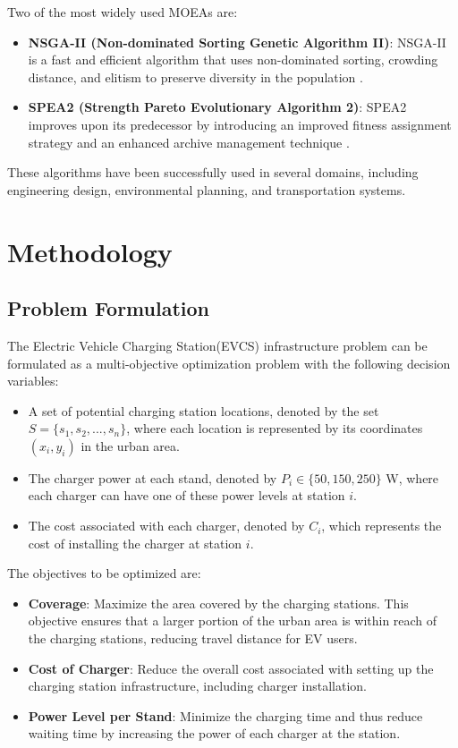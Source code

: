 \documentclass[12pt]{report}
\begin{document}
Two of the most widely used MOEAs are:
\begin{itemize}
    \item \textbf{NSGA-II (Non-dominated Sorting Genetic Algorithm II)}: NSGA-II is a fast and efficient algorithm that uses non-dominated sorting, crowding distance, and elitism to preserve diversity in the population \cite{ref6}.
    \item \textbf{SPEA2 (Strength Pareto Evolutionary Algorithm 2)}: SPEA2 improves upon its predecessor by introducing an improved fitness assignment strategy and an enhanced archive management technique \cite{ref7}.
\end{itemize}

These algorithms have been successfully used in several domains, including engineering design, environmental planning, and transportation systems.

\chapter{Methodology}

\section{Problem Formulation}
The Electric Vehicle Charging Station(EVCS) infrastructure problem can be formulated as a multi-objective optimization problem with the following decision variables:
\begin{itemize}
    \item A set of potential charging station locations, denoted by the set $S = \{s_1, s_2, ..., s_n\}$, where each location is represented by its coordinates $(x_i, y_i)$ in the urban area.
    \item The charger power at each stand, denoted by $P_i \in \{50, 150, 250\}$ W, where each charger can have one of these power levels at station $i$.
    \item The cost associated with each charger, denoted by $C_i$, which represents the cost of installing the charger at station $i$.
\end{itemize}

The objectives to be optimized are:
\begin{itemize}
     \item \textbf{Coverage}: Maximize the area covered by the charging stations. This objective ensures that a larger portion of the urban area is within reach of the charging stations, reducing travel distance for EV users.
    \item \textbf{Cost of Charger}: Reduce the overall cost associated with setting up the charging station infrastructure, including charger installation.   
    \item \textbf{Power Level per Stand}: Minimize the charging time and thus reduce waiting time by increasing the power of each charger at the station.
\end{itemize}
\end{document}

